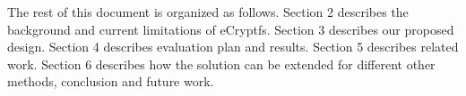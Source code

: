 

%
%

The rest of this document is organized as follows.  Section 2
describes the background and current limitations of eCryptfs.  Section
3 describes our proposed design.  Section 4 describes evaluation plan
and results.  Section 5 describes related work.  Section 6 describes
how the solution can be extended for different other methods,
conclusion and future work.

